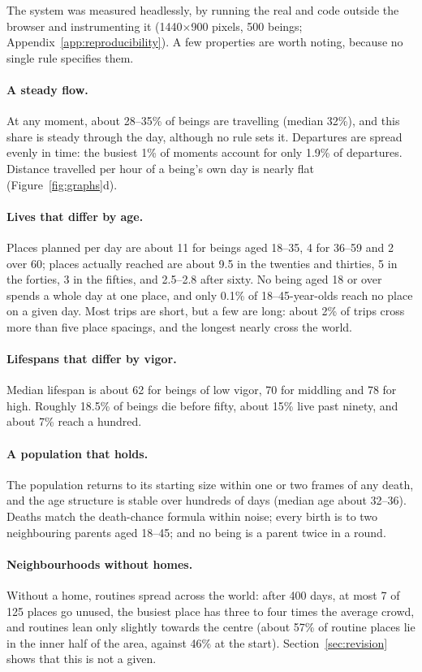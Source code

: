The system was measured headlessly, by running the real  and  code outside the browser and instrumenting it (1440$\times$900 pixels, 500 beings; Appendix~\ref{app:reproducibility}). A few properties are worth noting, because no single rule specifies them.

\paragraph{A steady flow.} At any moment, about 28--35\% of beings are travelling (median 32\%), and this share is steady through the day, although no rule sets it. Departures are spread evenly in time: the busiest 1\% of moments account for only 1.9\% of departures. Distance travelled per hour of a being's own day is nearly flat (Figure~\ref{fig:graphs}d).

\paragraph{Lives that differ by age.} Places planned per day are about 11 for beings aged 18--35, 4 for 36--59 and 2 over 60; places actually reached are about 9.5 in the twenties and thirties, 5 in the forties, 3 in the fifties, and 2.5--2.8 after sixty. No being aged 18 or over spends a whole day at one place, and only 0.1\% of 18--45-year-olds reach no place on a given day. Most trips are short, but a few are long: about 2\% of trips cross more than five place spacings, and the longest nearly cross the world.

\paragraph{Lifespans that differ by vigor.} Median lifespan is about 62 for beings of low vigor, 70 for middling and 78 for high. Roughly 18.5\% of beings die before fifty, about 15\% live past ninety, and about 7\% reach a hundred.

\paragraph{A population that holds.} The population returns to its starting size within one or two frames of any death, and the age structure is stable over hundreds of days (median age about 32--36). Deaths match the death-chance formula within noise; every birth is to two neighbouring parents aged 18--45; and no being is a parent twice in a round.

\paragraph{Neighbourhoods without homes.} Without a home, routines spread across the world: after 400 days, at most 7 of 125 places go unused, the busiest place has three to four times the average crowd, and routines lean only slightly towards the centre (about 57\% of routine places lie in the inner half of the area, against 46\% at the start). Section~\ref{sec:revision} shows that this is not a given.

